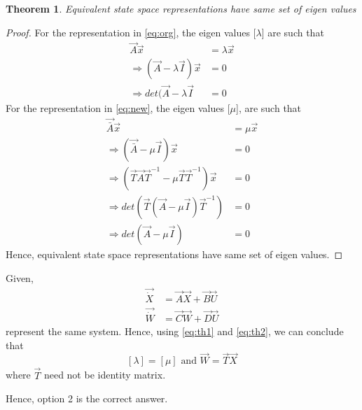 \documentclass[journal,12pt,twocolumn]{IEEEtran}
\newtheorem{theorem}{Theorem}[section]
\begin{document}
\begin{theorem}
Equivalent state space representations have same set of eigen values
\label{eq:th2}
\end{theorem}
\begin{proof}
For the representation in \eqref{eq:org}, the eigen values [$\lambda$] are such that
\begin{align}
    \vec{A}\vec{x}&=\lambda \vec{x}\\
    \Rightarrow(\vec{A}-\lambda \vec{I})\vec{x}&=0\\
    \Rightarrow det(\vec{A}-\lambda \vec{I}&=0
\end{align}
For the representation in \eqref{eq:new}, the eigen values [$\mu$], are such that
\begin{align}
    \vec{\bar A}\vec{x}&=\mu \vec{x}\\
    \Rightarrow(\vec{\bar A}-\mu \vec{I})\vec{x}&=0\\
    \Rightarrow(\vec{T}\vec{A}\vec{T}^{-1}-\mu \vec{T}\vec{T}^{-1})\vec{x}&=0\\
    \Rightarrow det(\vec{T}(\vec{A}-\mu \vec{I})\vec{T}^{-1})&=0\\
    \Rightarrow det(\vec{A}-\mu \vec{I})&=0
\end{align}
Hence, equivalent state space representations have same set of eigen values.
\end{proof}
Given,
\begin{align}
    \vec{\dot X}&=\vec{A}\vec{X}+\vec{B}\vec{U}\\
    \vec{\dot W}&=\vec{C}\vec{W}+\vec{D}\vec{U}
\end{align}
represent the same system. Hence, using \eqref{eq:th1} and \eqref{eq:th2}, we can conclude that
$$[\lambda]=[\mu] \text{ and } \vec{W}=\vec{T}\vec{X}$$
where $\vec{T}$ need not be identity matrix.


Hence, option 2 is the correct answer.
\end{document}
